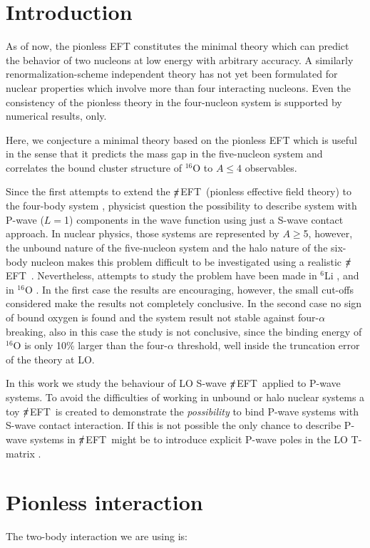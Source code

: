 \documentclass{article}
\newcommand{\eftnopi}{\mbox{$\slashed{\pi}$EFT }}
\begin{document}
\section{Introduction}
As of now, the pionless EFT constitutes the minimal theory which can predict the behavior of
two nucleons at low energy with arbitrary accuracy. A similarly renormalization-scheme independent
theory has not yet been formulated for nuclear properties which involve more than four interacting
nucleons. Even the consistency of the pionless theory in the four-nucleon system is supported by
numerical results, only.

Here, we conjecture a minimal theory based on the pionless EFT which is useful in the sense that
it predicts the mass gap in the five-nucleon system and correlates the bound cluster structure of
$^{16}$O to $A\leq4$ observables.

Since the first attempts to extend the \eftnopi (pionless effective field theory) to the four-body system \cite{Barnea:2013uqa}, physicist question the possibility to describe system with P-wave ($L=$1) components in the wave function using just a S-wave contact approach.
In nuclear physics, those systems are represented by $A\ge$5, however, the unbound nature of the five-nucleon system and the halo nature of the six-body nucleon makes this problem difficult to be investigated using a realistic \eftnopi.
Nevertheless, attempts to study the problem have been made in $^6$Li \cite{Barrett:2012dr}, and in $^{16}$O \cite{Contessi:2017rww}.
In the first case the results are encouraging, however, the small cut-offs considered make the results not completely conclusive.
In the second case no sign of bound oxygen is found and the system result not stable against four-$\alpha$ breaking, also in this case the study is not conclusive, since the binding energy of $^{16}$O is only 10\% larger than the four-$\alpha$ threshold, well inside the truncation error of the theory at LO.

In this work we study the behaviour of LO S-wave \eftnopi applied to P-wave systems.
To avoid the difficulties of working in unbound or halo nuclear systems a toy \eftnopi is created to demonstrate the \textit{possibility} to bind P-wave systems with S-wave contact interaction.
If this is not possible the only chance to describe P-wave systems in \eftnopi might be to introduce explicit P-wave poles in the LO T-matrix \cite{BERTULANI200237}.

\section{Pionless interaction}
The two-body interaction we are using is:
\end{document}
